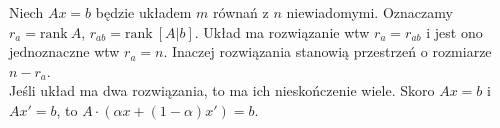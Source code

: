 \begin{theorem} 
Niech \( Ax = b \) będzie układem \( m \) równań z \( n \) niewiadomymi. Oznaczamy \( r_{a} = \text{rank}\: A \), \( r_{ab} = \text{rank}\: [A|b] \). Układ ma rozwiązanie wtw \( r_{a} = r_{ab} \) i jest ono jednoznaczne wtw \( r_{a} = n \). Inaczej rozwiązania stanowią przestrzeń \linebreak o rozmiarze \( n - r_{a} \). \\
Jeśli układ ma dwa rozwiązania, to ma ich nieskończenie wiele. Skoro \( Ax = b \) i \( Ax' = b \), \linebreak to \( A \cdot (\alpha x + (1 - \alpha)x') = b \).
\end{theorem} \\
